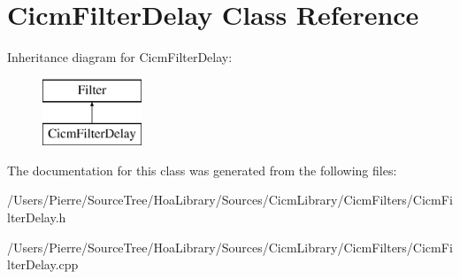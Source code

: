 \hypertarget{class_cicm_filter_delay}{\section{Cicm\-Filter\-Delay Class Reference}
\label{class_cicm_filter_delay}
}
Inheritance diagram for Cicm\-Filter\-Delay\-:\begin{figure}[H]
\begin{center}
\leavevmode
\includegraphics[height=2.000000cm]{class_cicm_filter_delay}
\end{center}
\end{figure}


The documentation for this class was generated from the following files\-:\begin{DoxyCompactItemize}
\item 
/\-Users/\-Pierre/\-Source\-Tree/\-Hoa\-Library/\-Sources/\-Cicm\-Library/\-Cicm\-Filters/Cicm\-Filter\-Delay.\-h\item 
/\-Users/\-Pierre/\-Source\-Tree/\-Hoa\-Library/\-Sources/\-Cicm\-Library/\-Cicm\-Filters/Cicm\-Filter\-Delay.\-cpp\end{DoxyCompactItemize}
